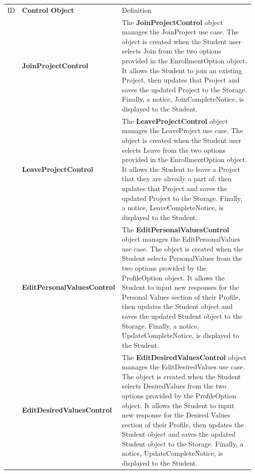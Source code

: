 \documentclass[12pt,letterpaper]{article}
\begin{document}
\begin{center}
\begin{tabu} to 
		\tableheader{}ID & Control Object & Definition\\
		 & Join\-Project\-Control & 
			The {\bf JoinProjectControl} object manages the JoinProject use case. The object is created when the Student user selects Join from the two options provided
			in the EnrollmentOption object. It allows the Student to join an existing Project, then updates that Project and saves the updated Project to the Storage. Finally, 
			a notice, JoinCompleteNotice, is displayed to the Student.\\
		
		 & Leave\-Project\-Control & 
			The {\bf LeaveProjectControl} object manages the LeaveProject use case. The object is created when the Student user selects Leave from the two options provided
			in the EnrollmentOption object. It allows the Student to leave a Project that they are already a part of, then updates that Project and saves the updated Project to
			the Storage. Finally, a notice, LeaveCompleteNotice, is displayed to the Student.\\
		
		 & Edit\-Personal\-Values\-Control & 
			The {\bf EditPersonalValuesControl} object manages the EditPersonalValues use case. The object is created when the Student selects PersonalValues from the two
			options provided by the ProfileOption object. It allows the Student to input new responses for the Personal Values section of their Profile, then updates the Student
			object and saves the updated Student object to the Storage. Finally, a notice, UpdateCompleteNotice, is displayed to the Student.\\
		
		 & Edit\-Desired\-Values\-Control & 
			The {\bf EditDesiredValuesControl} object manages the EditDesiredValues use case. The object is created when the Student selects DesiredValues from the two
			options provided by the ProfileOption object. It allows the Student to input new response for the Desired Values section of their Profile, then updates the Student
			object and saves the updated Student object to the Storage. Finally, a notice, UpdateCompleteNotice, is displayed to the Student. \\
		

\end{tabu}
\end{center}
\end{document}

